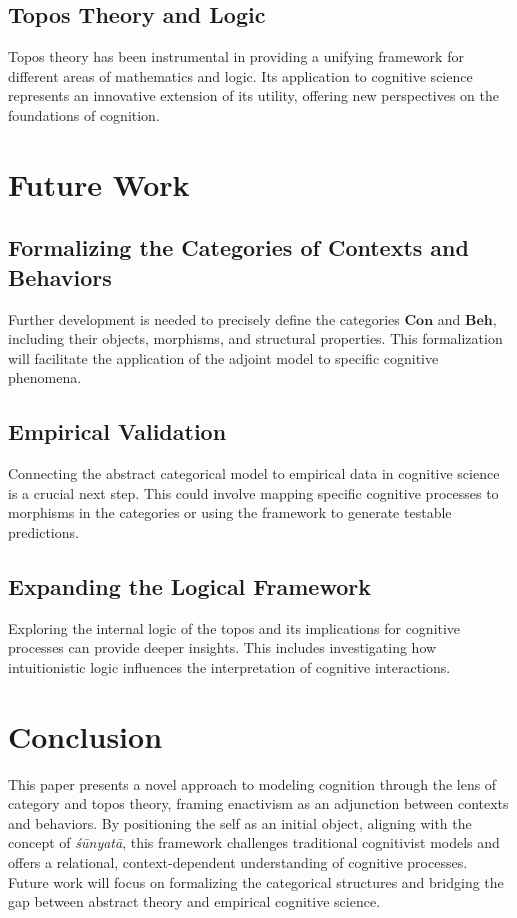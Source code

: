 \documentclass{article}
\begin{document}
\subsection{Topos Theory and Logic}

Topos theory has been instrumental in providing a unifying framework for different areas of mathematics and logic. Its application to cognitive science represents an innovative extension of its utility, offering new perspectives on the foundations of cognition.

\section{Future Work}

\subsection{Formalizing the Categories of Contexts and Behaviors}

Further development is needed to precisely define the categories $\mathbf{Con}$ and $\mathbf{Beh}$, including their objects, morphisms, and structural properties. This formalization will facilitate the application of the adjoint model to specific cognitive phenomena.

\subsection{Empirical Validation}

Connecting the abstract categorical model to empirical data in cognitive science is a crucial next step. This could involve mapping specific cognitive processes to morphisms in the categories or using the framework to generate testable predictions.

\subsection{Expanding the Logical Framework}

Exploring the internal logic of the topos and its implications for cognitive processes can provide deeper insights. This includes investigating how intuitionistic logic influences the interpretation of cognitive interactions.

\section{Conclusion}

This paper presents a novel approach to modeling cognition through the lens of category and topos theory, framing enactivism as an adjunction between contexts and behaviors. By positioning the self as an initial object, aligning with the concept of \emph{śūnyatā}, this framework challenges traditional cognitivist models and offers a relational, context-dependent understanding of cognitive processes. Future work will focus on formalizing the categorical structures and bridging the gap between abstract theory and empirical cognitive science.
\end{document}
